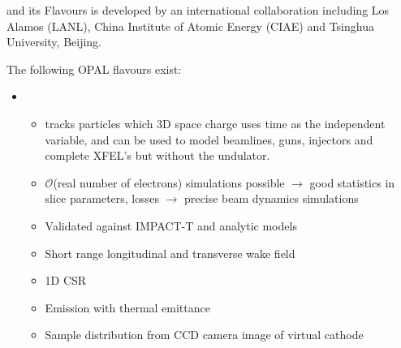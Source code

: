 \documentclass[xcolor=pdftex,table,10pt,yellow,mathserif]{beamer}
\begin{document}
\begin{frame}{\opal and its Flavours} {}
\opal is developed by an international collaboration including Los Alamos (LANL),  China Institute of Atomic Energy (CIAE) and Tsinghua University, Beijing.

The following OPAL flavours  exist:
\begin{itemize}
\item \opalt 
\begin{itemize}
\item \opalt   tracks particles which 3D space charge uses time as the independent variable, and can be used to model beamlines, guns, injectors and complete XFEL's but without the undulator.
\item $\mathcal{O}$(real number of electrons) simulations possible $\rightarrow $ good statistics in slice parameters, losses $\rightarrow $ precise beam dynamics simulations
\item Validated against IMPACT-T and analytic models
\item Short range longitudinal and transverse wake field 
\item 1D CSR
\item Emission with thermal emittance
\item Sample distribution from CCD camera image of virtual cathode
\end{itemize}
\end{itemize}
\end{frame}
\end{document}
